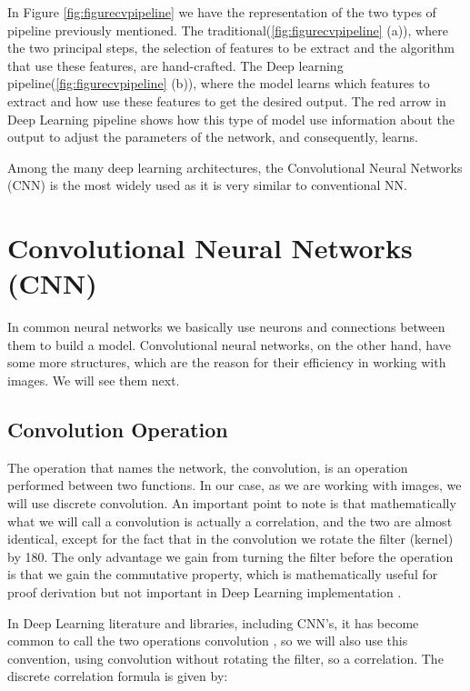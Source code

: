 In Figure \ref{fig:figurecvpipeline} we have the representation of the two types of pipeline previously mentioned. The traditional(\ref{fig:figurecvpipeline} (a)), where the two principal steps, the selection of features to be extract and the algorithm that use these features, are hand-crafted. The Deep learning pipeline(\ref{fig:figurecvpipeline} (b)), where the model learns which features to extract and how use these features to get the desired output. The red arrow in Deep Learning pipeline shows how this type of model use information about the output to adjust the parameters of the network, and consequently, learns.

Among the many deep learning architectures, the Convolutional Neural Networks (CNN) is the most widely used as it is very similar to conventional NN.

\section{Convolutional Neural Networks (CNN)}

In common neural networks we basically use neurons and connections between them to build a model. Convolutional neural networks, on the other hand, have some more structures, which are the reason for their efficiency in working with images. We will see them next.


\subsection{Convolution Operation}

The operation that names the network, the convolution, is an operation performed between two functions. In our case, as we are working with images, we will use discrete convolution.
An important point to note is that mathematically what we will call a convolution is actually a correlation, and the two are almost identical, except for the fact that in the convolution we rotate the filter (kernel) by 180\textdegree . The only advantage we gain from turning the filter before the operation is that we gain the commutative property, which is mathematically useful for proof derivation but not important in Deep Learning  implementation \cite{goodfellow2016}.

In Deep Learning  literature and libraries, including CNN's, it has become common to call the two operations convolution \cite{goodfellow2016}, so we will also use this convention, using convolution without rotating the filter, so a correlation.
The discrete correlation formula is given by:

